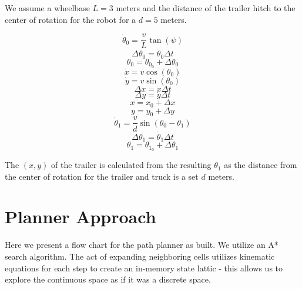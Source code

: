 \documentclass{article}
\begin{document}
We assume a wheelbase $L=3$ meters and the distance of the trailer hitch to the center of rotation for the robot for a $d=5$ meters.

\begin{equation}
    \dot{\theta}_0 = \frac{v}{L} \tan(\psi)
\end{equation}
\begin{equation}
    \Delta \theta_0 = \dot{\theta}_0 \Delta t
\end{equation}
\begin{equation}
    \theta_0 = \theta_{0_0} + \Delta \theta_0
\end{equation}
\begin{equation}
    \dot{x} = v \cos(\theta_0)
\end{equation}
\begin{equation}
    \dot{y} = v \sin(\theta_0)
\end{equation}
\begin{equation}
    \Delta x = \dot{x} \Delta t
\end{equation}
\begin{equation}
    \Delta y = \dot{y} \Delta t
\end{equation}
\begin{equation}
    x = x_0 + \Delta x
\end{equation}
\begin{equation}
    y = y_0 + \Delta y
\end{equation}
\begin{equation}
    \dot{\theta}_1 = \frac{v}{d}\sin(\theta_0 - \theta_1)
\end{equation}
\begin{equation}
    \Delta \theta_1 = \dot{\theta}_1 \Delta t
\end{equation}
\begin{equation}
    \theta_1 = \theta_{1_0} + \Delta \theta_1
\end{equation}

The $(x,y)$ of the trailer is calculated from the resulting $\theta_1$ as the distance from the center of rotation for the trailer and truck is a set $d$ meters.

\section*{Planner Approach}

Here we present a flow chart for the path planner as built. We utilize an A* search algorithm. The act of expanding neighboring cells utilizes kinematic equations for each step to create an in-memory state lattic - this allows us to explore the continuous space as if it was a discrete space.
\end{document}
